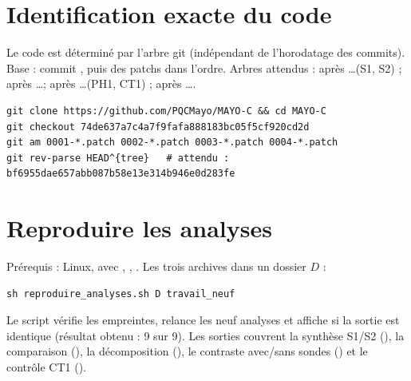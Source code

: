 \section{Identification exacte du code}
Le code est déterminé par l'arbre git (indépendant de l'horodatage des commits). Base :  commit , puis  des patchs dans l'ordre. Arbres attendus : après  \dots (S1, S2) ; après  \dots ; après  \dots (PH1, CT1) ; après  \dots.
\begin{verbatim}
git clone https://github.com/PQCMayo/MAYO-C && cd MAYO-C
git checkout 74de637a7c4a7f9fafa888183bc05f5cf920cd2d
git am 0001-*.patch 0002-*.patch 0003-*.patch 0004-*.patch
git rev-parse HEAD^{tree}   # attendu : bf6955dae657abb087b58e13e314b946e0d283fe
\end{verbatim}

\section{Reproduire les analyses}
Prérequis : Linux,  avec , , . Les trois archives dans un dossier $D$ :
\begin{verbatim}
sh reproduire_analyses.sh D travail_neuf
\end{verbatim}
Le script vérifie les empreintes, relance les neuf analyses et affiche  si la sortie est identique (résultat obtenu : 9 sur 9). Les sorties couvrent la synthèse S1/S2 (), la comparaison (), la décomposition (), le contraste avec/sans sondes () et le contrôle CT1 ().

